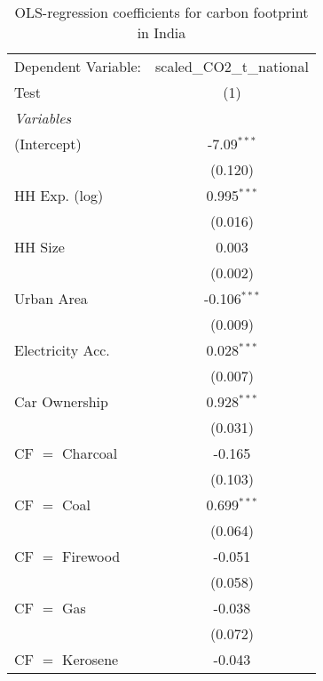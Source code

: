 
\begin{table}[htbp!]
   \centering
   \small
   \begin{adjustbox}{width = 1\textwidth, max height = 0.95\textheight, center}
      \begin{threeparttable}[b]
         \caption{\label{tab:OLS_2_IND} OLS-regression coefficients for carbon footprint in India}
         \begin{tabular}{lc}
            \tabularnewline \midrule \midrule
            Dependent Variable: & scaled\_CO2\_t\_national\\     
            Test                & (1)\\  
            \midrule
            \emph{Variables}\\
            (Intercept)         & -7.09$^{***}$\\   
                                & (0.120)\\   
            HH Exp. (log)       & 0.995$^{***}$\\   
                                & (0.016)\\   
            HH Size             & 0.003\\   
                                & (0.002)\\   
            Urban Area          & -0.106$^{***}$\\   
                                & (0.009)\\   
            Electricity Acc.    & 0.028$^{***}$\\   
                                & (0.007)\\   
            Car Ownership       & 0.928$^{***}$\\   
                                & (0.031)\\   
            CF $=$ Charcoal     & -0.165\\   
                                & (0.103)\\   
            CF $=$ Coal         & 0.699$^{***}$\\   
                                & (0.064)\\   
            CF $=$ Firewood     & -0.051\\   
                                & (0.058)\\   
            CF $=$ Gas          & -0.038\\   
                                & (0.072)\\   
            CF $=$ Kerosene     & -0.043\\   

\end{tabular}
\end{threeparttable}
\end{adjustbox}
\end{table}
